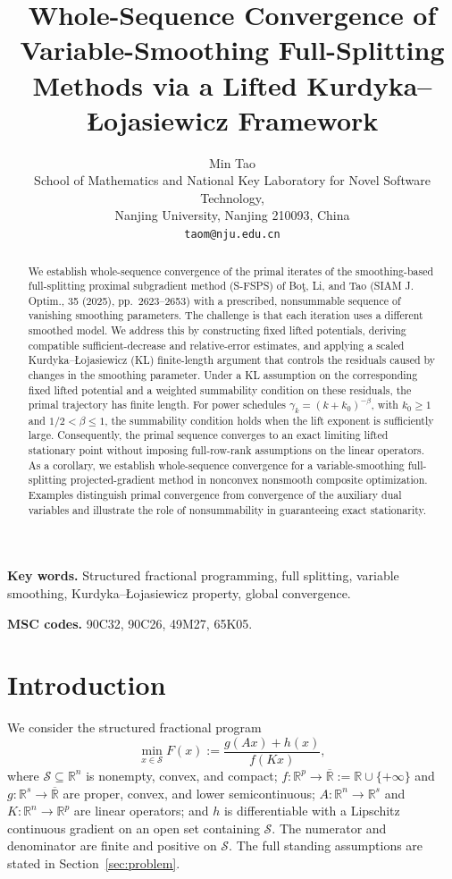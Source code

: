 \documentclass[9pt]{article}
\title{Whole-Sequence Convergence of Variable-Smoothing Full-Splitting Methods via a Lifted Kurdyka–\L{}ojasiewicz Framework}
\author{Min Tao\\
\small School of Mathematics and National Key Laboratory for Novel Software Technology,\\[-1mm]
\small Nanjing University, Nanjing 210093, China\\[-1mm]
\small \texttt{taom@nju.edu.cn}}
\date{}
\numberwithin{equation}{section}
\theoremstyle{definition}
\theoremstyle{remark}
\newcommand{\R}{\mathbb R}
\newcommand{\Sset}{\mathcal S}
\begin{document}
\maketitle

\begin{abstract}
We establish whole-sequence convergence of the primal iterates of
the smoothing-based full-splitting proximal subgradient method
(S-FSPS) of Bo\c{t}, Li, and Tao (SIAM J. Optim., 35 (2025),
pp.~2623--2653) with a prescribed, nonsummable sequence of vanishing
smoothing parameters. The challenge is that each iteration uses a
different smoothed model. We address this by constructing fixed lifted
potentials, deriving compatible sufficient-decrease and relative-error
estimates, and applying a scaled Kurdyka--\L{}ojasiewicz (KL)
finite-length argument that controls the residuals caused by changes
in the smoothing parameter. Under a KL assumption on the corresponding
fixed lifted potential and a weighted summability condition on these
residuals, the primal trajectory has finite length. For power schedules
$\gamma_k=(k+k_0)^{-\beta}$, with $k_0\geq1$ and
$1/2<\beta\leq1$, the summability condition holds when the lift
exponent is sufficiently large. Consequently, the primal sequence
converges to an exact limiting lifted stationary point without imposing full-row-rank assumptions on the linear operators. As a corollary, we
establish whole-sequence convergence for a variable-smoothing
full-splitting projected-gradient method in nonconvex nonsmooth
composite optimization. Examples distinguish primal convergence from
convergence of the auxiliary dual variables and illustrate the role of
nonsummability in guaranteeing exact stationarity.
\end{abstract}
\noindent\textbf{Key words.}
Structured fractional programming, full splitting, variable smoothing,
Kurdyka--\L{}ojasiewicz property, global convergence.

\noindent\textbf{MSC codes.} 90C32, 90C26, 49M27, 65K05.

\section{Introduction}\label{sec:intro}

We consider the structured fractional program
\begin{equation}\label{eq:problem}
 \min_{x\in\Sset} F(x):=\frac{g(Ax)+h(x)}{f(Kx)},
\end{equation}
where $\Sset\subseteq\R^n$ is nonempty, convex, and compact;
$f:\R^p\to\overline{\R}:=\R\cup\{+\infty\}$ and
$g:\R^s\to\overline{\R}$ are proper, convex, and lower semicontinuous;
$A:\R^n\to\R^s$ and $K:\R^n\to\R^p$ are linear operators;
and $h$ is differentiable with a Lipschitz continuous gradient on an open
set containing $\Sset$.
The numerator and denominator are finite and positive on $\Sset$.
The full standing assumptions are stated in Section~\ref{sec:problem}.
\end{document}
